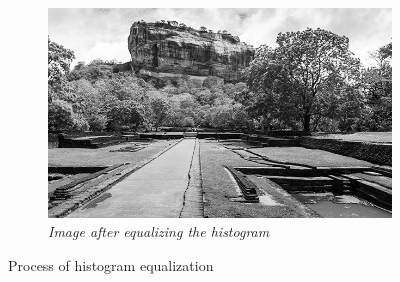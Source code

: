 \documentclass[11pt, a4paper]{article}
\begin{document}
\begin{figure}[H]
\begin{subfigure}[b]{0.32\textwidth}
	\end{subfigure}
	\hfill
	\begin{subfigure}[b]{0.32\textwidth}
		\centering
		\includegraphics[width=\textwidth]{./Outputs/Equalized_Image.png}
		\caption{{\small \textit{Image after equalizing the histogram}}}
		\label{fig:Equalized Image}
	\end{subfigure}
	\caption{Process of histogram equalization}
\end{figure}
\end{document}

